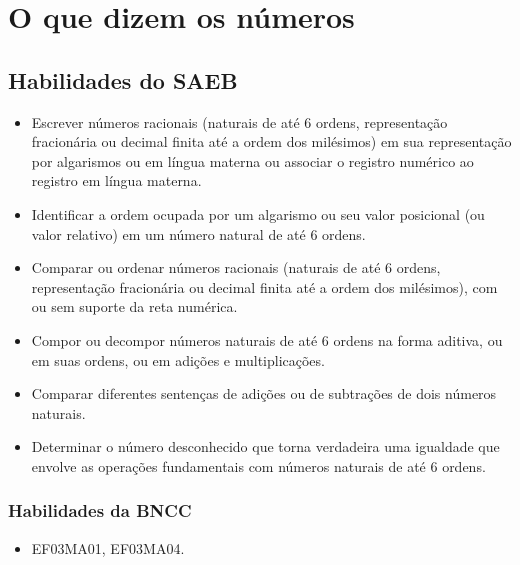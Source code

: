 

\chapter{O que dizem os números}

\vspace*{-1cm}

\section*{Habilidades do SAEB}


\begin{itemize}
  \item Escrever números racionais (naturais de até 6 ordens, representação
fracionária ou decimal finita até a ordem dos milésimos) em sua
representação por algarismos ou em língua materna ou associar o registro
numérico ao registro em língua materna.

  \item Identificar a ordem ocupada por um algarismo ou seu valor posicional
(ou valor relativo) em um número natural de até 6 ordens.

  \item Comparar ou ordenar números racionais (naturais de até 6 ordens,
representação fracionária ou decimal finita até a ordem dos milésimos),
com ou sem suporte da reta numérica.

  \item Compor ou decompor números naturais de até 6 ordens na forma aditiva,
ou em suas ordens, ou em adições e multiplicações.

  \item Comparar diferentes sentenças de adições ou de subtrações de dois
números naturais.

  \item Determinar o número desconhecido que torna verdadeira uma igualdade
que envolve as operações fundamentais com números naturais de até 6
ordens.
\end{itemize}


\subsection{Habilidades da BNCC}

\begin{itemize}
\item EF03MA01, EF03MA04.
\end{itemize}

